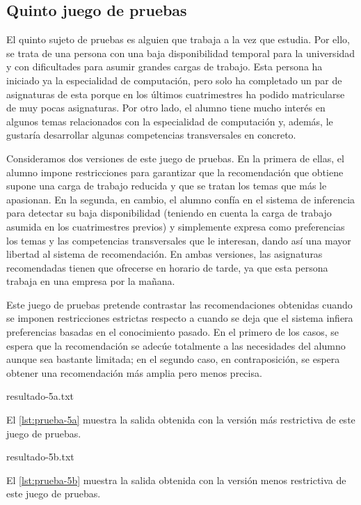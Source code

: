 
\subsection{Quinto juego de pruebas} \label{sec:prueba-5}

El quinto sujeto de pruebas es alguien que trabaja a la vez que estudia. Por 
ello, se trata de una persona con una baja disponibilidad temporal para la 
universidad y con dificultades para asumir grandes cargas de trabajo. Esta 
persona ha iniciado ya la especialidad de computación, pero solo ha 
completado un par de asignaturas de esta porque en los últimos cuatrimestres 
ha podido matricularse de muy pocas asignaturas. Por otro lado, el alumno 
tiene mucho interés en algunos temas relacionados con la especialidad de 
computación y, además, le gustaría desarrollar algunas competencias 
transversales en concreto.

Consideramos dos versiones de este juego de pruebas. En la primera de ellas, 
el alumno impone restricciones para garantizar que la recomendación que 
obtiene supone una carga de trabajo reducida y que se tratan los temas que 
más le apasionan. En la segunda, en cambio, el alumno confía en el sistema de 
inferencia para detectar su baja disponibilidad (teniendo en cuenta la carga 
de trabajo asumida en los cuatrimestres previos) y simplemente expresa como 
preferencias los temas y las competencias transversales que le interesan, 
dando así una mayor libertad al sistema de recomendación. En ambas versiones,
las asignaturas recomendadas tienen que ofrecerse en horario de tarde, ya que 
esta persona trabaja en una empresa por la mañana.

Este juego de pruebas pretende contrastar las recomendaciones obtenidas cuando 
se imponen restricciones estrictas respecto a cuando se deja que el sistema 
infiera preferencias basadas en el conocimiento pasado. En el primero de los 
casos, se espera que la recomendación se adecúe totalmente a las 
necesidades del alumno aunque sea bastante limitada; en el segundo caso, en 
contraposición, se espera obtener una recomendación más amplia pero menos 
precisa.

%
    {resultado-5a.txt}

El \autoref{lst:prueba-5a} muestra la salida obtenida con la versión más 
restrictiva de este juego de pruebas.

%
    {resultado-5b.txt}

El \autoref{lst:prueba-5b} muestra la salida obtenida con la versión menos 
restrictiva de este juego de pruebas.


